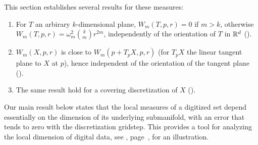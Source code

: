 This section establishes several results for these measures:
\begin{enumerate}
\item For $T$ an arbirary $k$-dimensional plane, $W_m(T,p,r)=0$ if
  $m>k$, otherwise $W_m(T,p,r)=\omega_m^2\binom{k}{m}r^{2m}$,
  independently of the orientation of $T$ in $\mathbb{R}^d$ ().
\item $W_m(X,p,r)$ is close to $W_m(p+T_p X,p,r)$ (for $T_p X$ the
  linear tangent plane to $X$ at $p$), hence independent of the orientation
  of the tangent plane ().
\item The same result hold for a covering discretization of $X$ ().
\end{enumerate}

Our main result below states that the local measures of a digitized
set depend essentially on the dimension of its underlying submanifold,
with an error that tends to zero with the discretization
gridstep. This provides a tool for analyzing the local dimension of
digital data, see ,
page~\pageref{fig-illustration}, for an illustration.

